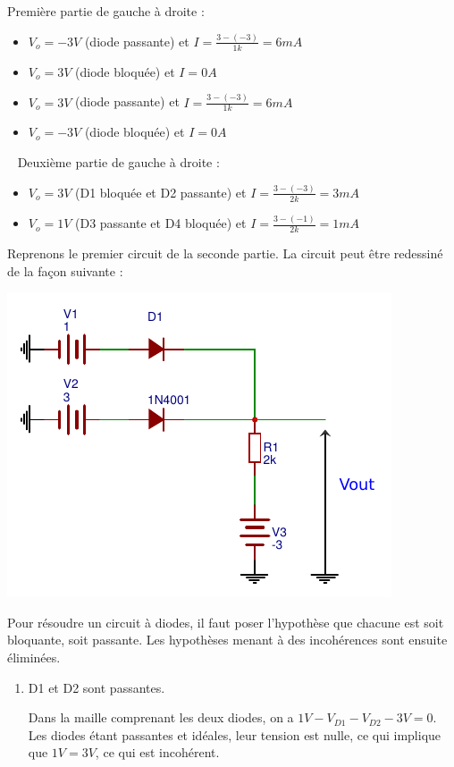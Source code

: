 \documentclass{../template/tp}
\begin{document}
{%
Première partie de gauche à droite :
\begin{itemize}
    \item $V_o = -3V$ (diode passante) et $I = \frac{3-(-3)}{1k}=6mA$
    \item $V_o = 3V$ (diode bloquée) et $I=0A$
    \item $V_o = 3V$ (diode passante) et $I= \frac{3-(-3)}{1k}=6mA$
    \item $V_o = -3V$ (diode bloquée) et $I = 0A$
\end{itemize}
~\newline
Deuxième partie de gauche à droite :
\begin{itemize}
    \item $V_o = 3V$ (D1 bloquée et D2 passante) et $I = \frac{3-(-3)}{2k} = 3mA$
    \item $V_o = 1V$ (D3 passante et D4 bloquée) et $I = \frac{3-(-1)}{2k} = 1mA$
\end{itemize}

Reprenons le premier circuit de la seconde partie.
La circuit peut être redessiné de la façon suivante :
\begin{center}
    \includegraphics[scale=1.4]{ex3-corrige}
\end{center}

Pour résoudre un circuit à diodes, il faut poser l'hypothèse que chacune est soit bloquante, soit passante.
Les hypothèses menant à des incohérences sont ensuite éliminées.

\begin{enumerate}
    \item D1 et D2 sont passantes.

    Dans la maille comprenant les deux diodes, on a $1V - V_{D1} -V_{D2} - 3V = 0$.
    Les diodes étant passantes et idéales, leur tension est nulle, ce qui implique que $1V = 3V$, ce qui est incohérent.


\end{enumerate}}
\end{document}
